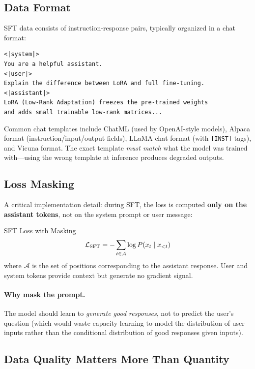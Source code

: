 \subsection{Data Format}

SFT data consists of instruction-response pairs, typically organized in a chat
format:

\begin{lstlisting}[language={}, caption={Typical SFT training example (ChatML format)}]
<|system|>
You are a helpful assistant.
<|user|>
Explain the difference between LoRA and full fine-tuning.
<|assistant|>
LoRA (Low-Rank Adaptation) freezes the pre-trained weights
and adds small trainable low-rank matrices...
\end{lstlisting}

Common chat templates include ChatML (used by OpenAI-style models), Alpaca
format (instruction/input/output fields), LLaMA chat format (with
\texttt{[INST]} tags), and Vicuna format.  The exact template
\emph{must match} what the model was trained with---using the wrong template
at inference produces degraded outputs.

\subsection{Loss Masking}

A critical implementation detail: during SFT, the loss is computed
\textbf{only on the assistant tokens}, not on the system prompt or user
message:

\begin{mathresult}{SFT Loss with Masking}
\[
    \mathcal{L}_{\text{SFT}} = -\sum_{t \in \mathcal{A}} \log P(x_t \mid x_{<t})
\]
where $\mathcal{A}$ is the set of positions corresponding to the assistant
response.  User and system tokens provide context but generate no gradient signal.
\end{mathresult}

\paragraph{Why mask the prompt.}
The model should learn to \emph{generate good responses}, not to predict the
user's question (which would waste capacity learning to model the distribution
of user inputs rather than the conditional distribution of good responses given
inputs).

\subsection{Data Quality Matters More Than Quantity}

